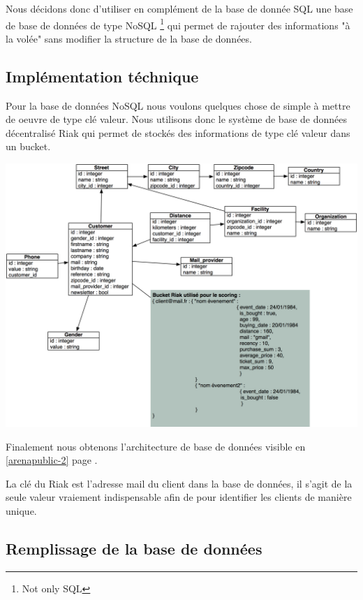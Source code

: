 Nous décidons donc d'utiliser en complément de la base de donnée SQL une base de base de données de type NoSQL \footnote{Not only SQL} qui permet de rajouter des informations "à la volée" sans modifier la structure de la base de données. 

\subsection{Implémentation téchnique}
Pour la base de données NoSQL nous voulons quelques chose de simple à mettre de oeuvre de type clé valeur. Nous utilisons donc le système de base de données décentralisé Riak qui permet de stockés des informations de type clé valeur dans un bucket.

\begin{center}
\includegraphics[scale=0.62]{images/arenapublic-2.png}
\label{arenapublic-2}
\end{center}

Finalement nous obtenons l'architecture de base de données visible en \ref{arenapublic-2} page \pageref{arenapublic-2}.

La clé du Riak est l'adresse mail du client dans la base de données, il s'agit de la seule valeur vraiement indispensable afin de pour identifier les clients de manière unique.

\subsection{Remplissage de la base de données}

